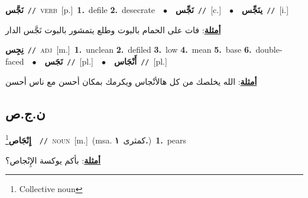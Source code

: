 \documentclass[10pt,a4paper,twoside]{article} %
\begin{document}
\begin{multicols}{2}
{\setlength\topsep{0pt}\textbf{\foreignlanguage{arabic}{نَجَّس}}\ {\color{gray}\texttt{//}\color{black}}\ \textsc{verb}\ [p.]\ \textbf{1.}~defile  \textbf{2.}~desecrate\ \ $\bullet$\ \ \setlength\topsep{0pt}\textbf{\foreignlanguage{arabic}{نَجِّس}}\ {\color{gray}\texttt{//}\color{black}}\ [c.]\ \ $\bullet$\ \ \setlength\topsep{0pt}\textbf{\foreignlanguage{arabic}{ينَجِّس}}\ {\color{gray}\texttt{//}\color{black}}\ [i.]\  \begin{flushright}\color{gray}\foreignlanguage{arabic}{\textbf{\underline{\foreignlanguage{arabic}{أمثلة}}}: فات على الحمام بالبوت وطلع يتمشور بالبوت نَجَّس الدار}\end{flushright}\color{black}} \vspace{2mm}

{\setlength\topsep{0pt}\textbf{\foreignlanguage{arabic}{نِجِس}}\ {\color{gray}\texttt{//}\color{black}}\ \textsc{adj}\ [m.]\ \textbf{1.}~unclean  \textbf{2.}~defiled  \textbf{3.}~low  \textbf{4.}~mean  \textbf{5.}~base  \textbf{6.}~double-faced\ \ $\bullet$\ \ \setlength\topsep{0pt}\textbf{\foreignlanguage{arabic}{نَجَس}}\ {\color{gray}\texttt{//}\color{black}}\ [pl.]\ \ $\bullet$\ \ \setlength\topsep{0pt}\textbf{\foreignlanguage{arabic}{أَنْجَاس}}\ {\color{gray}\texttt{//}\color{black}}\ [pl.]\  \begin{flushright}\color{gray}\foreignlanguage{arabic}{\textbf{\underline{\foreignlanguage{arabic}{أمثلة}}}: الله يخلصك من كل هالأنْجاس ويكرمك بمكان أحسن مع ناس أحسن}\end{flushright}\color{black}} \vspace{2mm}

\vspace{-3mm}
\subsection*{\color{blue}\foreignlanguage{arabic}{ن.ج.ص}\color{blue}{}} 

{\setlength\topsep{0pt}\textbf{\foreignlanguage{arabic}{إِنْجَاص}}\footnote{Collective noun}\ \ {\color{gray}\texttt{//}\color{black}}\ \textsc{noun}\ [m.]\ \color{gray}(msa. \foreignlanguage{arabic}{كمثرى}~\foreignlanguage{arabic}{\textbf{١.}})\color{black}\ \textbf{1.}~pears\  \begin{flushright}\color{gray}\foreignlanguage{arabic}{\textbf{\underline{\foreignlanguage{arabic}{أمثلة}}}: بأكم يوكسة الإِنْجاص؟}\end{flushright}\color{black}} \vspace{2mm}


\end{multicols}
\end{document}
